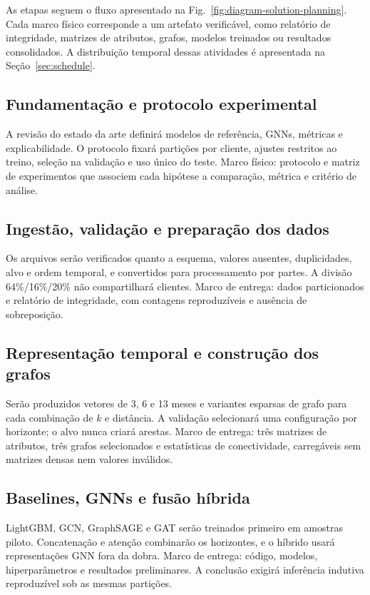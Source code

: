 \documentclass[conference]{IEEEtran}
\begin{document}
As etapas seguem o fluxo apresentado na Fig.~\ref{fig:diagram-solution-planning}. Cada marco físico corresponde a um artefato verificável, como relatório de integridade, matrizes de atributos, grafos, modelos treinados ou resultados consolidados. A distribuição temporal dessas atividades é apresentada na Seção~\ref{sec:schedule}.

\subsection{Fundamentação e protocolo experimental}

A revisão do estado da arte definirá modelos de referência, GNNs, métricas e explicabilidade. O protocolo fixará partições por cliente, ajustes restritos ao treino, seleção na validação e uso único do teste. Marco físico: protocolo e matriz de experimentos que associem cada hipótese a comparação, métrica e critério de análise.

\subsection{Ingestão, validação e preparação dos dados}

Os arquivos serão verificados quanto a esquema, valores ausentes, duplicidades, alvo e ordem temporal, e convertidos para processamento por partes. A divisão 64\%/16\%/20\% não compartilhará clientes. Marco de entrega: dados particionados e relatório de integridade, com contagens reproduzíveis e ausência de sobreposição.

\subsection{Representação temporal e construção dos grafos}

Serão produzidos vetores de 3, 6 e 13 meses e variantes esparsas de grafo para cada combinação de $k$ e distância. A validação selecionará uma configuração por horizonte; o alvo nunca criará arestas. Marco de entrega: três matrizes de atributos, três grafos selecionados e estatísticas de conectividade, carregáveis sem matrizes densas nem valores inválidos.

\subsection{Baselines, GNNs e fusão híbrida}

LightGBM, GCN, GraphSAGE e GAT serão treinados primeiro em amostras piloto. Concatenação e atenção combinarão os horizontes, e o híbrido usará representações GNN fora da dobra. Marco de entrega: código, modelos, hiperparâmetros e resultados preliminares. A conclusão exigirá inferência indutiva reproduzível sob as mesmas partições.
\end{document}

